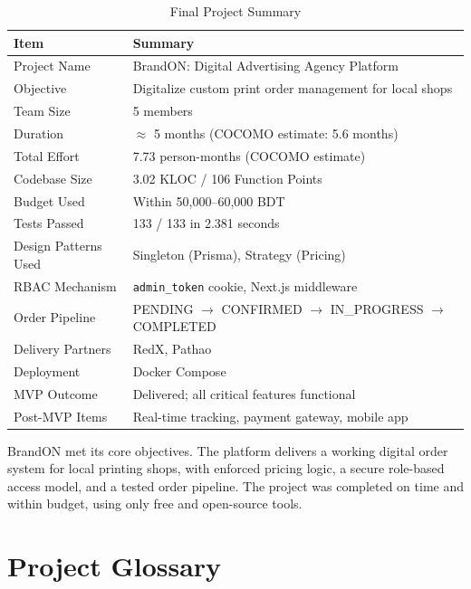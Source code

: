 \documentclass[12pt,a4paper]{report}
\begin{document}
\begin{table}[H]
  \centering
  \caption{Final Project Summary}
  \begin{tabularx}{\textwidth}{L{4cm} X}
    \toprule
    \textbf{Item} & \textbf{Summary} \\
    \midrule
    Project Name          & BrandON: Digital Advertising Agency Platform \\
    Objective             & Digitalize custom print order management for local shops \\
    Team Size             & 5 members \\
    Duration              & $\approx$ 5 months (COCOMO estimate: 5.6 months) \\
    Total Effort          & 7.73 person-months (COCOMO estimate) \\
    Codebase Size         & 3.02 KLOC / 106 Function Points \\
    Budget Used           & Within 50,000--60,000 BDT \\
    Tests Passed          & 133 / 133 in 2.381 seconds \\
    Design Patterns Used  & Singleton (Prisma), Strategy (Pricing) \\
    RBAC Mechanism        & \texttt{admin\_token} cookie, Next.js middleware \\
    Order Pipeline        & PENDING $\to$ CONFIRMED $\to$ IN\_PROGRESS $\to$ COMPLETED \\
    Delivery Partners     & RedX, Pathao \\
    Deployment            & Docker Compose \\
    MVP Outcome           & Delivered; all critical features functional \\
    Post-MVP Items        & Real-time tracking, payment gateway, mobile app \\
    \bottomrule
  \end{tabularx}
\end{table}

BrandON met its core objectives. The platform delivers a working digital order system for local printing shops, with enforced pricing logic, a secure role-based access model, and a tested order pipeline. The project was completed on time and within budget, using only free and open-source tools.

\appendix
\chapter{Project Glossary}
\end{document}
